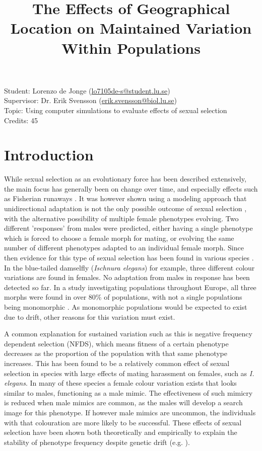 \documentclass{article}
\title{The Effects of Geographical Location on Maintained Variation Within Populations}
\date{\vspace{-5ex}}
\begin{document}
\maketitle
\noindent Student: Lorenzo de Jonge (\href{mailto:lo7105de-s@student.lu.se}{lo7105de-s@student.lu.se})\\
Supervisor: Dr. Erik Svensson (\href{mailto:erik.svensson@biol.lu.se}{erik.svensson@biol.lu.se})\\
Topic: Using computer simulations to evaluate effects of sexual selection\\
Credits: 45\\

\section{Introduction}
While sexual selection as an evolutionary force has been described extensively, the main focus has generally been on change over time, and especially effects such as Fisherian runaways \cite{Fisher1915}. It was however shown using a modeling approach that unidirectional adaptation is not the only possible outcome of sexual selection \cite{Gavrilets2002}, with the alternative possibility of multiple female phenotypes evolving. Two different 'responses' from males were predicted, either having a single phenotype which is forced to choose a female morph for mating, or evolving the same number of different phenotypes adapted to an individual female morph. Since then evidence for this type of sexual selection has been found in various species \cite{Hardling2006,Kagawa2016,Svensson2007}. In the blue-tailed damselfly (\textit{Ischnura elegans}) for example, three different colour variations are found in females. No adaptation from males in response has been detected so far. In a study investigating populations throughout Europe, all three morphs were found in over 80\% of populations, with not a single populations being monomorphic \cite{Gosden2011}.  As monomorphic populations would be expected to exist due to drift, other reasons for this variation must exist.

A common explanation for sustained variation such as this is negative frequency dependent selection (NFDS), which means fitness of a certain phenotype decreases as the proportion of the population with that same phenotype increases. This has been found to be a relatively common effect of sexual selection in species with large effects of mating harassment on females, such as \textit{I. elegans}. In many of these species a female colour variation exists that looks similar to males, functioning as a male mimic. The effectiveness of such mimicry is reduced when male mimics are common, as the males will develop a search image for this phenotype. If however male mimics are uncommon, the individuals with that colouration are more likely to be successful. These effects of sexual selection have been shown both theoretically and empirically to explain the stability of phenotype frequency despite genetic drift (e.g. \cite{Hardling2006,LeRouzic2015,Svensson2005}).
\end{document}

